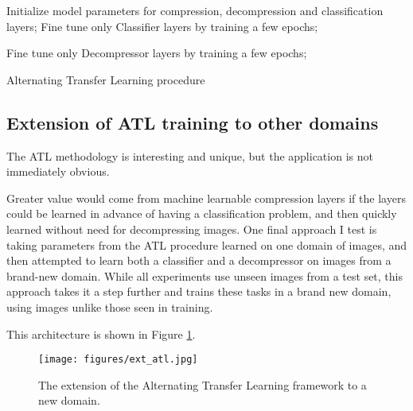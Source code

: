 \documentclass[twoside,11pt]{article}
\begin{document}
\begin{algorithm}[H]
\SetAlgoLined
{}
 Initialize model parameters for compression, decompression and classification layers;
 Fine tune only Classifier layers by training a few epochs;

 Fine tune only Decompressor layers by training a few epochs;
 \caption{Alternating Transfer Learning procedure}
 \label{alg:alternate}
\end{algorithm}


\subsection{Extension of ATL training to other domains}

The ATL methodology is interesting and unique, but the application is not immediately obvious.

Greater value would come from machine learnable compression layers if the layers could
be learned in advance of having a classification problem, and then quickly learned without
need for decompressing images. One final approach I test is taking parameters from the ATL 
procedure learned on one domain of images, and then attempted to learn both a classifier
and a decompressor on images from a brand-new domain. While all experiments use unseen images from a test
set, this approach takes it a step further and trains these tasks in a brand new domain,
using images unlike those seen in training. 

This architecture is shown in Figure \ref{fig:ext_atl}.

\begin{figure}[h]
  \texttt{[image: figures/ext\_atl.jpg]}
  \caption{The extension of the Alternating Transfer Learning framework to a new domain.}
  \label{fig:ext_atl}
\end{figure}
\end{document}
